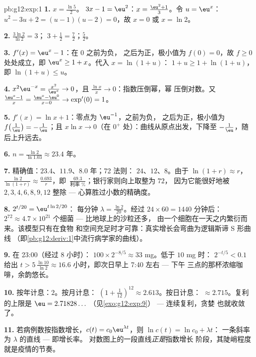 \begin{solution}{pb:g12:exp:1}
\textbf{1.} $x = \frac{\ln 5}{2}$。\quad
$3x - 1 = \eu^2$：$x = \frac{\eu^2 + 1}{3}$。\quad 令
$u = \eu^x$：$u^2 - 3u + 2 = (u - 1)(u - 2) = 0$，故 $x = 0$ 或
$x = \ln 2$。

\textbf{2.} $\frac{3\ln 2}{\ln 2} = 3$；\quad
$3 + \frac12 = \frac72$；\quad $\frac52$。

\textbf{3.} $f'(x) = \eu^x - 1$：在 $0$ 之前为负，
之后为正，极小值为 $f(0) = 0$，故 $f \geq 0$ 处处成立，即
$\eu^x \geq 1 + x$。代入 $x = \ln(1 + u)$：
$1 + u \geq 1 + \ln(1 + u)$，即 $\ln(1 + u) \leq u$。

\textbf{4.} $x^2\eu^{-x} = \frac{x^2}{\eu^x} \to 0$，且
$\frac{\ln x}{x} \to 0$：指数压倒幂，幂
压倒对数。又 $\frac{\eu^x - 1}{x} =
\frac{\eu^x - \eu^0}{x - 0} \to \exp'(0) = 1$。

\textbf{5.} $f'(x) = \ln x + 1$：零点为 $\eu^{-1}$，之前为负，
之后为正，极小值为
$f\!\left(\frac1\eu\right) = -\frac1\eu$；且
$x \ln x \to 0$（在 $0^+$ 处）：曲线从原点出发，下降至
$-\frac1\eu$，随后上升远去。

\textbf{6.} $n = \frac{\ln 2}{\ln 1.03} \approx 23.4$ 年。

\textbf{7.} 精确值：$23.4$、$11.9$、$8.0$ 年；72 法则：
$24$、$12$、$8$。由于 $\ln(1+r) \approx r$，
$\frac{\ln 2}{\ln(1+r)} \approx \frac{0.693}{r}$，即\
$\frac{69.3}{\text{利率 }\%}$；银行家则向上取整为 $72$，
因为它能很好地被 $2, 3, 4, 6, 8, 9, 12$ 整除 ---
心算胜过小数的精确度。

\textbf{8.} $2^{t/20} = \eu^{t \ln 2 / 20}$：
每分钟 $\lambda = \frac{\ln 2}{20}$。经过
$24 \times 60 = 1440$ 分钟后：$2^{72} \approx 4.7 \times
10^{21}$ 个细菌 --- 比地球上的沙粒还多，
由一个细胞在一天之内繁衍而来。该模型只有在食物
和空间充足时才可靠：真实增长会弯曲为逻辑斯谛 S 形曲线
（即\cref{pb:g12:deriv:1}中流行病学家的曲线）。

\textbf{9.} 在 23:00（经过 $8$ 小时）：
$100 \times 2^{-8/5} \approx 33$ mg。低于 $10$ mg 时：
$2^{-t/5} < 0.1$ 给出 $t > 5\,\frac{\ln 10}{\ln 2} \approx
16.6$ 小时，即次日早上 7:40 左右 --- 下午
三点的那杯浓缩咖啡，余韵悠长。

\textbf{10.} 按年计息：$2$。按月计息：
$\left(1 + \frac{1}{12}\right)^{12} \approx 2.613$。按日计息：
$\approx 2.715$。复利的上限是 $\eu = 2.71828\ldots$
（见\cref{exo:g12:exp:9}） --- 连续复利，贪婪
也就收敛了。

\textbf{11.} 若病例数按指数增长，$c(t) = c_0
\eu^{\lambda t}$，则 $\ln c(t) = \ln c_0 + \lambda t$：
一条斜率为 $\lambda$ 的直线 --- 即增长率。
对数图上的一段直线\emph{正是}指数增长
阶段，其陡峭程度就是疫情的节奏。


\end{solution}
